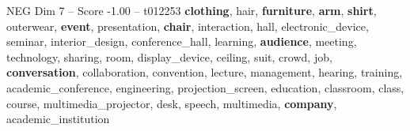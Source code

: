 \begin{textsample}{NEG Dim 7 – Score -1.00 – t012253}  \label{ex:f7_neg_033}
\textbf{clothing}, hair, \textbf{furniture}, \textbf{arm}, \textbf{shirt}, outerwear, \textbf{event}, presentation, \textbf{chair}, interaction, hall, electronic\_device, seminar, interior\_design, conference\_hall, learning, \textbf{audience}, meeting, technology, sharing, room, display\_device, ceiling, suit, crowd, job, \textbf{conversation}, collaboration, convention, lecture, management, hearing, training, academic\_conference, engineering, projection\_screen, education, classroom, class, course, multimedia\_projector, desk, speech, multimedia, \textbf{company}, academic\_institution

\end{textsample}
